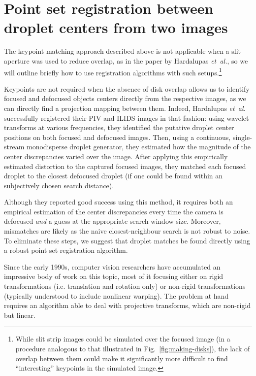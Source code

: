 \documentclass[preprint]{elsarticle}
\begin{document}
\section{Point set registration between droplet centers from two images\label{sec:pointset}}
The keypoint matching approach described above is not applicable when a slit
aperture was used to reduce overlap, as in the paper by Hardalupas
\emph{et~al.}, so we will outline briefly how to use registration algorithms
with such setups.\footnote{While slit strip images could be
simulated over the focused image (in a procedure analogous to that illustrated
in Fig.~\ref{fig:making-disks}), the lack of overlap between them could make it
significantly more difficult to find ``interesting'' keypoints in the simulated
image.}

Keypoints are not required when the absence of disk overlap allows
us to identify focused and defocused objects centers directly from the respective
images, as we can directly find a projection mapping between them. Indeed, Hardalupas
\emph{et~al.} successfully registered their PIV and ILIDS images in that fashion: using
wavelet transforms at various frequencies, they identified the putative droplet
center positions on both focused and defocused images.  Then, using a continuous,
single-stream monodisperse droplet generator, they estimated how the magnitude
of the center discrepancies varied over the image.  After applying this
empirically estimated distortion to the captured focused images, they matched each
focused droplet to the closest defocused droplet (if one could be found within an
subjectively chosen search distance).

Although they reported good success using this method, it requires both an
empirical estimation of the center discrepancies every time the camera is
defocused \emph{and} a guess at the appropriate search window size. Moreover,
mismatches are likely as the naive closest-neighbour search is not robust to
noise. To eliminate these steps, we suggest that droplet matches be found
directly using a robust point set registration algorithm.

Since the early 1990s, computer vision researchers have accumulated an
impressive body of work on this topic, most of it focusing either
on rigid transformations (i.e. translation and rotation only) or non-rigid
transformations (typically understood to include nonlinear warping). The problem
at hand requires an algorithm able to deal with projective transforms, which
are non-rigid but linear.
\end{document}

